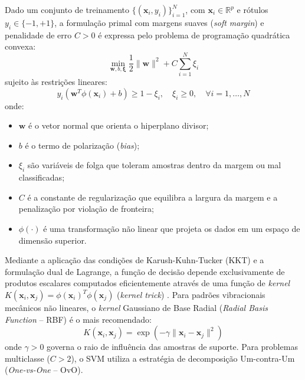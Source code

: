 Dado um conjunto de treinamento $\{(\mathbf{x}_i, y_i)\}_{i=1}^{N}$, com $\mathbf{x}_i \in \mathbb{R}^p$ e rótulos $y_i \in \{-1, +1\}$, a formulação primal com margens suaves (\textit{soft margin}) e penalidade de erro $C > 0$ é expressa pelo problema de programação quadrática convexa:
\begin{equation}
    \min_{\mathbf{w}, b, \boldsymbol{\xi}} \frac{1}{2} \|\mathbf{w}\|^2 + C \sum_{i=1}^{N} \xi_i
    \label{eq:svm_primal}
\end{equation}
sujeito às restrições lineares:
\begin{equation}
    y_i (\mathbf{w}^T \phi(\mathbf{x}_i) + b) \ge 1 - \xi_i, \quad \xi_i \ge 0, \quad \forall i = 1, \dots, N
    \label{eq:svm_restricoes}
\end{equation}
onde:
\begin{itemize}
    \item $\mathbf{w}$ é o vetor normal que orienta o hiperplano divisor;
    \item $b$ é o termo de polarização (\textit{bias});
    \item $\xi_i$ são variáveis de folga que toleram amostras dentro da margem ou mal classificadas;
    \item $C$ é a constante de regularização que equilibra a largura da margem e a penalização por violação de fronteira;
    \item $\phi(\cdot)$ é uma transformação não linear que projeta os dados em um espaço de dimensão superior.
\end{itemize}

Mediante a aplicação das condições de Karush-Kuhn-Tucker (KKT) e a formulação dual de Lagrange, a função de decisão depende exclusivamente de produtos escalares computados eficientemente através de uma função de \textit{kernel} $K(\mathbf{x}_i, \mathbf{x}_j) = \phi(\mathbf{x}_i)^T \phi(\mathbf{x}_j)$ (\textit{kernel trick}) \cite{cortes1995support}. Para padrões vibracionais mecânicos não lineares, o \textit{kernel} Gaussiano de Base Radial (\textit{Radial Basis Function} -- RBF) é o mais recomendado:
\begin{equation}
    K(\mathbf{x}_i, \mathbf{x}_j) = \exp\left( -\gamma \|\mathbf{x}_i - \mathbf{x}_j\|^2 \right)
    \label{eq:kernel_rbf}
\end{equation}
onde $\gamma > 0$ governa o raio de influência das amostras de suporte. Para problemas multiclasse ($C > 2$), o SVM utiliza a estratégia de decomposição Um-contra-Um (\textit{One-vs-One} -- OvO).

